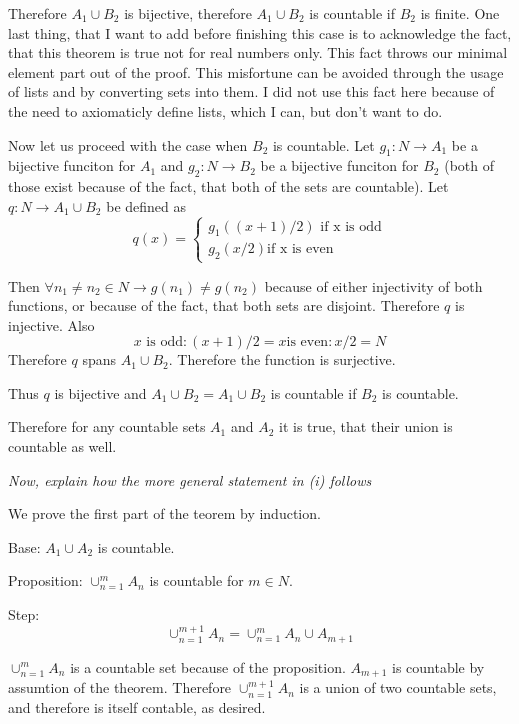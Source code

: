 \documentclass[11pt,oneside,titlepage]{article}
\begin{document}
Therefore $A_1 \cup B_2$ is bijective, therefore $A_1 \cup B_2$ is countable
if $B_2$ is finite. One last thing, that I want to add before finishing this case
is to acknowledge the fact, that this theorem is  true not for
real numbers only. This fact throws our minimal element part out of  the proof.
This misfortune can be avoided through the usage of lists and by converting sets
into them. I did not use this fact here because of the need to axiomaticly
define lists, which I can, but don't want to do. 

Now let us proceed with the case when $B_2$ is countable. Let $g_1: N \to A_1$ be a bijective funciton for $A_1$ and $g_2: N \to B_2$ be a bijective funciton
for $B_2$ (both of those exist because of the fact, that both of the sets are
countable).  Let $q: N \to A_1 \cup B_2$ be defined as
\begin{equation}
  q(x) =
  \begin{cases}
    g_1((x + 1) /  2) \text{ if x is odd} \\
    g_2(x / 2) \text{if x is even}
  \end{cases}
\end{equation}

Then $\forall n_1 \neq n_2 \in N \to g(n_1) \neq g(n_2)$ because of either
injectivity of both functions, or because of the fact, that both sets are
disjoint. Therefore $q$ is injective. Also
$${x \text{ is odd}: (x + 1) / 2} = {x \text{is even}: x/2 } = N$$
Therefore $q$ spans $A_1 \cup B_2$. Therefore the function is surjective.

Thus $q$ is bijective and $A_1 \cup B_2 = A_1 \cup B_2$ is countable if
$B_2$ is countable.

Therefore for any countable sets $A_1$ and $A_2$ it is true, that their
union is countable as well.

\textit{Now, explain how the more general statement in (i) follows}

We prove the first part of the teorem by induction.

Base: $A_1 \cup A_2$ is countable.

Proposition: $\cup^{m}_{n = 1}A_n$ is countable for $m \in N$.

Step:
$$\cup^{m + 1}_{n = 1}A_n = \cup^{m}_{n = 1}A_n \cup A_{m + 1}$$

$\cup^{m}_{n = 1}A_n$ is a countable set because of the proposition.
$A_{m + 1}$ is countable by assumtion of the theorem. Therefore
$\cup^{m + 1}_{n = 1}A_n$ is a union of two countable sets, and therefore is
itself contable, as desired.
\end{document}
